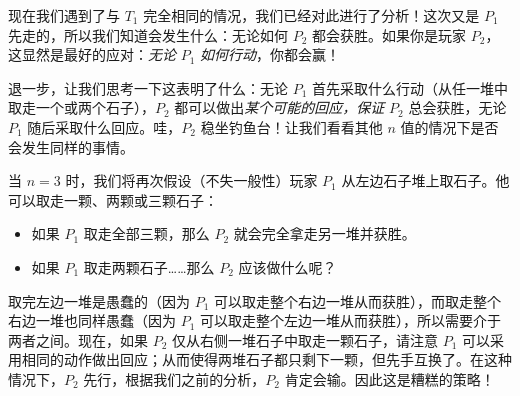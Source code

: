 \begin{center}
\end{center}
现在我们遇到了与 $T_1$ 完全相同的情况，我们已经对此进行了分析！这次又是 $P_1$ 先走的，所以我们知道会发生什么：无论如何 $P_2$ 都会获胜。如果你是玩家 $P_2$，这显然是最好的应对：\emph{无论} $P_1$ \emph{如何行动}，你都会赢！

退一步，让我们思考一下这表明了什么：无论 $P_1$ 首先采取什么行动（从任一堆中取走一个或两个石子），$P_2$ 都可以做出\emph{某个可能的回应，保证} $P_2$ 总会获胜，无论 $P_1$ 随后采取什么回应。哇，$P_2$ 稳坐钓鱼台！让我们看看其他 $n$ 值的情况下是否会发生同样的事情。

当 $n = 3$ 时，我们将再次假设（不失一般性）玩家 $P_1$ 从左边石子堆上取石子。他可以取走一颗、两颗或三颗石子：

\begin{itemize}
    \item 如果 $P_1$ 取走全部三颗，那么 $P_2$ 就会完全拿走另一堆并获胜。
    \item 如果 $P_1$ 取走两颗石子……那么 $P_2$ 应该做什么呢？
\end{itemize}
取完左边一堆是愚蠢的（因为 $P_1$ 可以取走整个右边一堆从而获胜），而取走整个右边一堆也同样愚蠢（因为 $P_1$ 可以取走整个左边一堆从而获胜），所以需要介于两者之间。现在，如果 $P_2$ 仅从右侧一堆石子中取走一颗石子，请注意 $P_1$ 可以采用相同的动作做出回应；从而使得两堆石子都只剩下一颗，但先手互换了。在这种情况下，$P_2$ 先行，根据我们之前的分析，$P_2$ 肯定会输。因此这是糟糕的策略！

